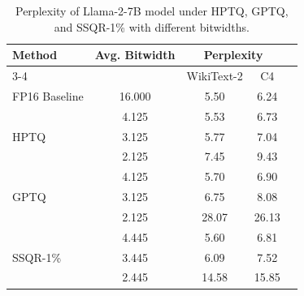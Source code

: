 \documentclass{article} %
\begin{document}
\begin{table}[htpb]
\caption{Perplexity of Llama-2-7B model under HPTQ, GPTQ, and SSQR-1\% with different bitwidths.}
\label{tab:llama2_7b_results}
\begin{center}
\begin{tabular}{lcccc}
\toprule
Method & Avg. Bitwidth & \multicolumn{2}{c}{Perplexity}  \\
\cmidrule(r){3-4}
      &           & WikiText-2 & C4 \\
\midrule
FP16 Baseline & 16.000 & 5.50 & 6.24 \\
\midrule
\multirow{3}{*}{HPTQ} & 4.125 & 5.53 & 6.73 \\
           & 3.125 & 5.77 & 7.04 \\
           & 2.125 & 7.45 & 9.43  \\
\midrule
\multirow{3}{*}{GPTQ} & 4.125 & 5.70 & 6.90 \\
           & 3.125 & 6.75 & 8.08 \\
           & 2.125 & 28.07 & 26.13 \\
\midrule
\multirow{3}{*}{SSQR-1\%} & 4.445 & 5.60 & 6.81 \\
           & 3.445 & 6.09 & 7.52 \\
           & 2.445 & 14.58 & 15.85 \\
\bottomrule
\end{tabular}
\end{center}
\end{table}
\end{document}
